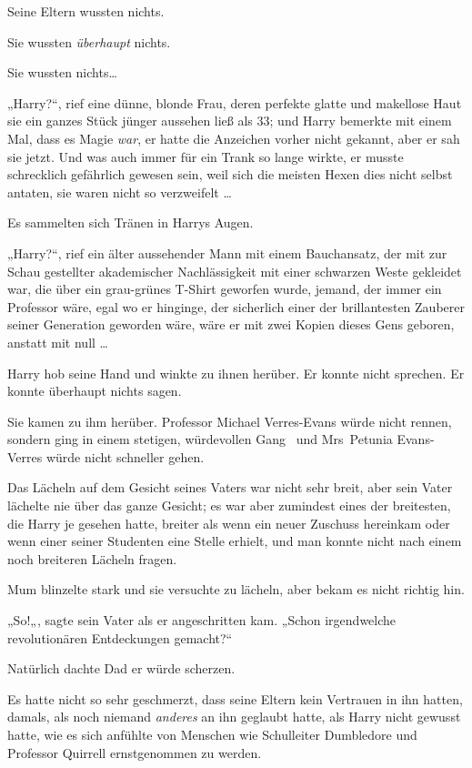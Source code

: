 {Seine Eltern wussten nichts.

Sie wussten \emph{überhaupt} nichts.

Sie wussten nichts…

„Harry?“, rief eine dünne, blonde Frau, deren perfekte glatte und makellose Haut sie ein ganzes Stück jünger aussehen ließ als 33; und Harry bemerkte mit einem Mal, dass es Magie \emph{war}, er hatte die Anzeichen vorher nicht gekannt, aber er sah sie jetzt. Und was auch immer für ein Trank so lange wirkte, er musste schrecklich gefährlich gewesen sein, weil sich die meisten Hexen dies nicht selbst antaten, sie waren nicht so verzweifelt …

Es sammelten sich Tränen in Harrys Augen.

„Harry?“, rief ein älter aussehender Mann mit einem Bauchansatz, der mit zur Schau gestellter akademischer Nachlässigkeit mit einer schwarzen Weste gekleidet war, die über ein grau-grünes T-Shirt geworfen wurde, jemand, der immer ein Professor wäre, egal wo er hinginge, der sicherlich einer der brillantesten Zauberer seiner Generation geworden wäre, wäre er mit zwei Kopien dieses Gens geboren, anstatt mit null …

Harry hob seine Hand und winkte zu ihnen herüber. Er konnte nicht sprechen. Er konnte überhaupt nichts sagen.

Sie kamen zu ihm herüber. Professor Michael Verres-Evans würde nicht rennen, sondern ging in einem stetigen, würdevollen Gang ~und Mrs~Petunia Evans-Verres würde nicht schneller gehen.

Das Lächeln auf dem Gesicht seines Vaters war nicht sehr breit, aber sein Vater lächelte nie über das ganze Gesicht; es war aber zumindest eines der breitesten, die Harry je gesehen hatte, breiter als wenn ein neuer Zuschuss hereinkam oder wenn einer seiner Studenten eine Stelle erhielt, und man konnte nicht nach einem noch breiteren Lächeln fragen.

Mum blinzelte stark und sie versuchte zu lächeln, aber bekam es nicht richtig hin.

„So!„, sagte sein Vater als er angeschritten kam. „Schon irgendwelche revolutionären Entdeckungen gemacht?“

Natürlich dachte Dad er würde scherzen.

Es hatte nicht so sehr geschmerzt, dass seine Eltern kein Vertrauen in ihn hatten, damals, als noch niemand \emph{anderes} an ihn geglaubt hatte, als Harry nicht gewusst hatte, wie es sich anfühlte von Menschen wie Schulleiter Dumbledore und Professor Quirrell ernstgenommen zu werden.

}
